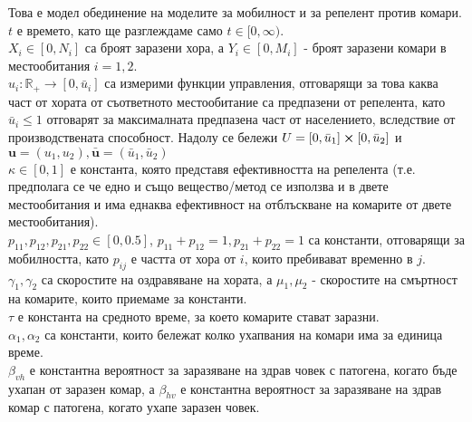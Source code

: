 Това е модел обединение на моделите за мобилност и за репелент против комари. \\
$t$ е времето, като ще разглеждаме само $t \in [0, \infty)$. \\
$X_i \in [0, N_i]$ са броят заразени хора, а $Y_i \in [0, M_i]$ - броят заразени комари в местообитания $i=1,2$. \\
$u_i :\mathbb{R}_+ \rightarrow [0, \bar{u}_i]$ са измерими функции управления, отговарящи за това каква част от хората от съответното местообитание са предпазени от репелента, като $\bar{u}_i \leq 1 $ отговарят за максималната предпазена част от населението, вследствие от производствената способност. Надолу се бележи $U = [0, \bar{u}_1] \cross [0, \bar{u}_2]$ и $\mathbf{u} = (u_1, u_2), \bar{\mathbf{u}} = (\bar{u}_1, \bar{u}_2)$ \\
$\kappa \in [0, 1]$ е константа, която представя ефективността на репелента (т.е. предполага се че едно и също вещество/метод се използва и в двете местообитания и има еднаква ефективност на отблъскване на комарите от двете местообитания). \\
$p_{11}, p_{12}, p_{21}, p_{22} \in [0, 0.5]$, $p_{11} + p_{12} = 1, p_{21} + p_{22} = 1$ са константи, отговарящи за мобилността, като $p_{ij}$ е частта от хора от $i$, които пребивават временно в $j$. \\
$\gamma_1, \gamma_2$ са скоростите на оздравяване на хората, а $\mu_1, \mu_2$ - скоростите на смъртност на комарите, които приемаме за константи. \\
$\tau$ е константа на средното време, за което комарите стават заразни. \\
$\alpha_1, \alpha_2$ са константи, които бележат колко ухапвания на комари има за единица време. \\
$\beta_{vh}$ е константна вероятност за заразяване на здрав човек с патогена, когато бъде ухапан от заразен комар, а $\beta_{hv}$ е константна вероятност за заразяване на здрав комар с патогена, когато ухапе заразен човек.

